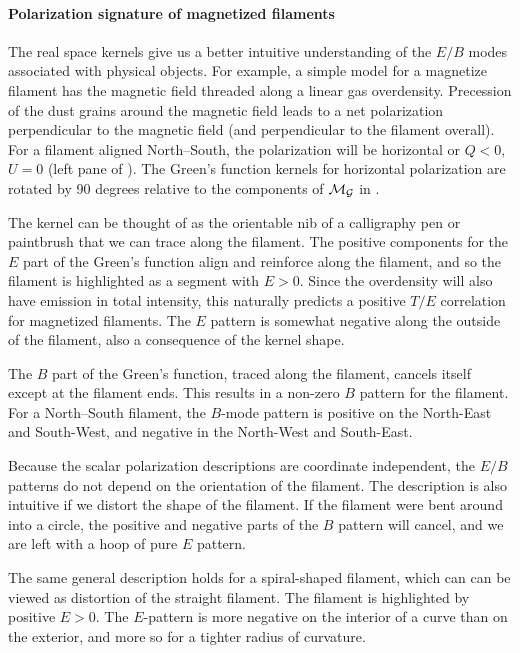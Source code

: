 \paragraph{Polarization signature of magnetized filaments}
The real space kernels give us a better intuitive understanding of the $E/B$ modes associated with physical objects.  For example, a simple model for a magnetize filament has the magnetic field threaded along a linear gas overdensity.  Precession of the dust grains around the magnetic field leads to a net polarization perpendicular to the magnetic field (and perpendicular to the filament overall).  For a filament aligned North--South, the polarization will be horizontal or $Q<0$, $U=0$ (left pane of ).  The Green's function kernels for horizontal polarization are rotated by 90 degrees relative to the components of $\cal{M}_G$ in .

The kernel can be thought of as the orientable nib of a calligraphy pen or paintbrush that we can trace along the filament.  The positive components for the $E$ part of the Green's function align and reinforce along the filament, and so the filament is highlighted as a segment with $E>0$.  Since the overdensity will also have emission in total intensity, this naturally predicts a positive $T/E$ correlation for magnetized filaments.  The $E$ pattern is somewhat negative along the outside of the filament, also a consequence of the kernel shape.

The $B$ part of the Green's function, traced along the filament, cancels itself except at the filament ends.  This results in a non-zero $B$ pattern for the filament.  For a North--South filament, the $B$-mode pattern is positive on the North-East and South-West, and negative in the North-West and South-East.  

Because the scalar polarization descriptions are coordinate independent, the $E/B$ patterns do not depend on the orientation of the filament.
The description is also intuitive if we distort the shape of the filament.  If the filament were bent around into a circle, the positive and negative parts of the $B$ pattern will cancel, and we are left with a hoop of pure $E$ pattern.

The same general description holds for a spiral-shaped filament, which can can be viewed as distortion of the straight filament.  The filament is highlighted by positive $E>0$.  The $E$-pattern is more negative on the interior of a curve than on the exterior, and more so for a tighter radius of curvature.


